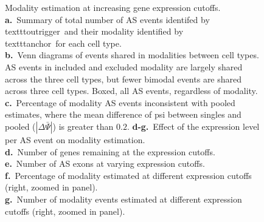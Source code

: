 \clearpage
\thispagestyle{facingcaption}
\begin{figure}[h]
\captionsetup{labelformat=prev-page}
\caption[Modality estimation at increasing gene expression cutoffs.]{Modality estimation at increasing gene expression cutoffs.\\
\textbf{a.}~Summary of total number of AS events identifed by \\texttt{outrigger}\, and their modality identified by \\texttt{anchor}\, for each cell type.\\
\textbf{b.}~Venn diagrams of events shared in modalities between cell types. AS events in included and excluded modality are largely shared across the three cell types, but fewer bimodal events are shared across three cell types. Boxed, all AS events, regardless of modality.\\
\textbf{c.}~Percentage of modality AS events inconsistent with pooled estimates, where the mean difference of psi between singles and pooled ($|\Delta\bar{\Psi}|$) is greater than $0.2$.
\textbf{d-g.}~Effect of the expression level per AS event on modality estimation.\\
\textbf{d.}~Number of genes remaining at the expression cutoffs.\\
\textbf{e.}~Number of AS exons at varying expression cutoffs.\\
\textbf{f.}~Percentage of modality estimated at different expression cutoffs (right, zoomed in panel).\\
\textbf{g.}~Number of modality events estimated at different expression cutoffs (right, zoomed in panel).\\
}
\label{fig:anchor_supplementary}
\end{figure}
\clearpage
